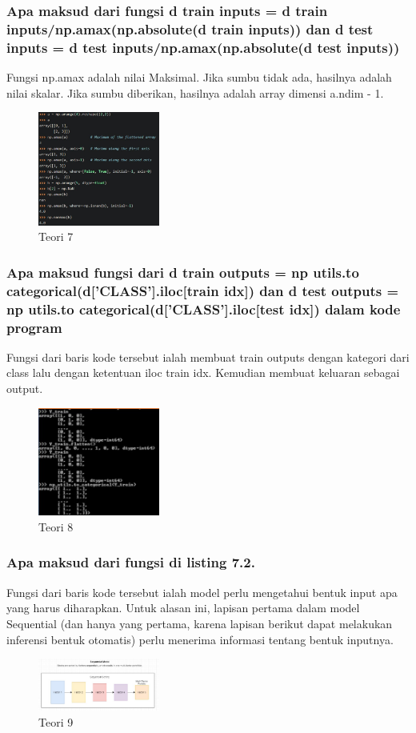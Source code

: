 \subsubsection{Apa maksud dari fungsi d train inputs = d train inputs/np.amax(np.absolute(d train inputs)) dan d test inputs = d test inputs/np.amax(np.absolute(d test inputs))}
\hfill\break
Fungsi np.amax adalah nilai Maksimal. Jika sumbu tidak ada, hasilnya adalah nilai skalar. Jika sumbu diberikan, hasilnya adalah array dimensi a.ndim - 1.
\begin{figure}[H]
\centering
	\includegraphics[width=4cm]{figures/1174067/7/7.jpg}
\caption{Teori 7}
\end{figure}

\subsubsection{Apa maksud fungsi dari d train outputs = np utils.to categorical(d[’CLASS’].iloc[train idx]) dan d test outputs = np utils.to categorical(d[’CLASS’].iloc[test idx]) dalam kode program}
\hfill\break
Fungsi dari baris kode tersebut ialah membuat train outputs dengan kategori dari class lalu dengan ketentuan iloc train idx. Kemudian membuat keluaran sebagai output.
\begin{figure}[H]
\centering
	\includegraphics[width=4cm]{figures/1174067/7/8.jpg}
\caption{Teori 8}
\end{figure}

\subsubsection{Apa maksud dari fungsi di listing 7.2.}
\hfill\break

Fungsi dari baris kode tersebut ialah model perlu mengetahui bentuk input apa yang harus diharapkan. Untuk alasan ini, lapisan pertama dalam model Sequential (dan hanya yang pertama, karena lapisan berikut dapat melakukan inferensi bentuk otomatis) perlu menerima informasi tentang bentuk inputnya.
\begin{figure}[H]
\centering
	\includegraphics[width=4cm]{figures/1174067/7/9.jpg}
\caption{Teori 9}
\end{figure}


